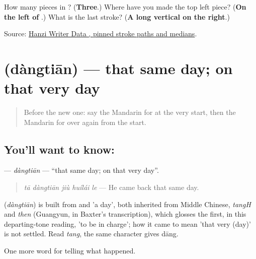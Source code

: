 \begin{tcolorbox}[breakable,colback=teal!4,colframe=teal!35!black,title={Before you move on}]
How many pieces in ? (\textbf{Three}.) Where have you made the top left piece? (\textbf{On the left of }.) What is the last stroke? (\textbf{A long vertical on the right}.)

Source: \href{https://raw.githubusercontent.com/chanind/hanzi-writer-data/68d10a4b21150cae5e1ebbd223eed289cf32d90c/data/\%E6\%96\%B0.json}{Hanzi Writer Data , pinned stroke paths and medians}.
\end{tcolorbox}
\section[\texorpdfstring{\zh{当天} (dàngtiān)}{当天 (dàngtiān)}]{ (dàngtiān) — that same day; on that very day}

\label{lesson:ZH-C295-dangtian}



\begin{quote}
Before the new one: say the Mandarin for at the very start, then the Mandarin for over again from the start.
\end{quote}

\subsection*{You'll want to know: }
\textbf{} — \emph{dàngtiān} — \textquotedblleft{}that same day; on that very day\textquotedblright{}.

\begin{quote}
\textbf{} \emph{tā dàngtiān jiù huílái le} — He came back that same day.
\end{quote}

\begin{cousinweb}
\textbf{} (\emph{dàngtiān}) is built from  and  'a day', both inherited from Middle Chinese, \emph{tangH} and \emph{then} (Guangyun, in Baxter's transcription), which glosses the first, in this departing-tone reading, 'to be in charge'; how it came to mean 'that very (day)' is not settled. Read \emph{tang}, the same character gives dāng.
\end{cousinweb}

\begin{grammarlens}[title={What you've built}]
One more word for telling what happened.
\end{grammarlens}

